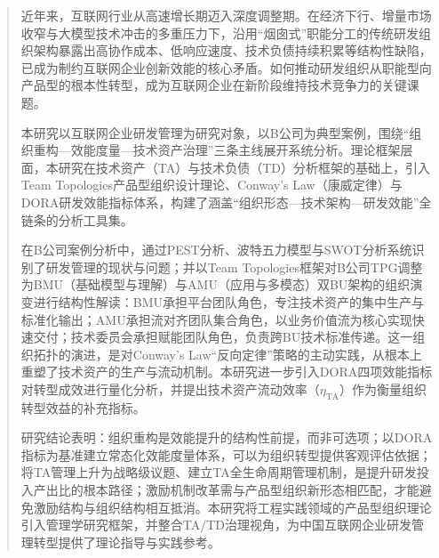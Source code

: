 

\begin{abstract}
  近年来，互联网行业从高速增长期迈入深度调整期。在经济下行、增量市场收窄与大模型技术冲击的多重压力下，沿用“烟囱式”职能分工的传统研发组织架构暴露出高协作成本、低响应速度、技术负债持续积累等结构性缺陷，已成为制约互联网企业创新效能的核心矛盾。如何推动研发组织从职能型向产品型的根本性转型，成为互联网企业在新阶段维持技术竞争力的关键课题。

  本研究以互联网企业研发管理为研究对象，以B公司为典型案例，围绕“组织重构—效能度量—技术资产治理”三条主线展开系统分析。理论框架层面，本研究在技术资产（TA）与技术负债（TD）分析框架的基础上，引入Team Topologies产品型组织设计理论、Conway's Law（康威定律）与DORA研发效能指标体系，构建了涵盖“组织形态—技术架构—研发效能”全链条的分析工具集。

  在B公司案例分析中，通过PEST分析、波特五力模型与SWOT分析系统识别了研发管理的现状与问题；并以Team Topologies框架对B公司TPG调整为BMU（基础模型与理解）与AMU（应用与多模态）双BU架构的组织演变进行结构性解读：BMU承担平台团队角色，专注技术资产的集中生产与标准化输出；AMU承担流对齐团队集合角色，以业务价值流为核心实现快速交付；技术委员会承担赋能团队角色，负责跨BU技术标准传递。这一组织拓扑的演进，是对Conway's Law“反向定律”策略的主动实践，从根本上重塑了技术资产的生产与流动机制。本研究进一步引入DORA四项效能指标对转型成效进行量化分析，并提出技术资产流动效率（$\eta_{\mathrm{TA}}$）作为衡量组织转型效益的补充指标。

  研究结论表明：组织重构是效能提升的结构性前提，而非可选项；以DORA指标为基准建立常态化效能度量体系，可以为组织转型提供客观评估依据；将TA管理上升为战略级议题、建立TA全生命周期管理机制，是提升研发投入产出比的根本路径；激励机制改革需与产品型组织新形态相匹配，才能避免激励结构与组织结构相互抵消。本研究将工程实践领域的产品型组织理论引入管理学研究框架，并整合TA/TD治理视角，为中国互联网企业研发管理转型提供了理论指导与实践参考。

\end{abstract}

